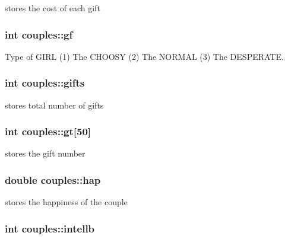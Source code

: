 stores the cost of each gift 

\hypertarget{classcouples_a13f719ac7e434039c139de22fa57b256}{
\subsubsection[{gf}]{\setlength{\rightskip}{0pt plus 5cm}int couples\-::gf}}\label{classcouples_a13f719ac7e434039c139de22fa57b256}


Type of G\-I\-R\-L (1) The C\-H\-O\-O\-S\-Y (2) The N\-O\-R\-M\-A\-L (3) The D\-E\-S\-P\-E\-R\-A\-T\-E. 

\hypertarget{classcouples_add4d20dc8238e648baa53e29581dee87}{
\subsubsection[{gifts}]{\setlength{\rightskip}{0pt plus 5cm}int couples\-::gifts}}\label{classcouples_add4d20dc8238e648baa53e29581dee87}


stores total number of gifts 

\hypertarget{classcouples_a2a00372f1404d39119a3d3d91c75ef34}{
\subsubsection[{gt}]{\setlength{\rightskip}{0pt plus 5cm}int couples\-::gt\mbox{[}50\mbox{]}}}\label{classcouples_a2a00372f1404d39119a3d3d91c75ef34}


stores the gift number 

\hypertarget{classcouples_ae5dc16b92f1846c004c0a21ef7b9e693}{
\subsubsection[{hap}]{\setlength{\rightskip}{0pt plus 5cm}double couples\-::hap}}\label{classcouples_ae5dc16b92f1846c004c0a21ef7b9e693}


stores the happiness of the couple 

\hypertarget{classcouples_ab429dcb707ba6dd54208431a24780ce3}{
\subsubsection[{intellb}]{\setlength{\rightskip}{0pt plus 5cm}int couples\-::intellb}}\label{classcouples_ab429dcb707ba6dd54208431a24780ce3}


